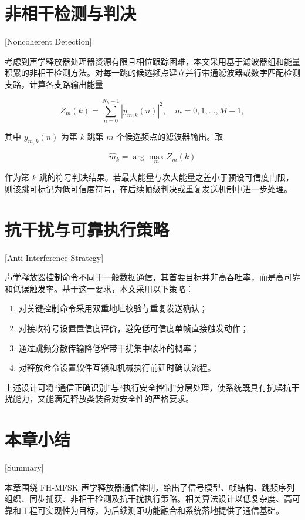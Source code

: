 \section{非相干检测与判决}[Noncoherent Detection]

考虑到声学释放器处理器资源有限且相位跟踪困难，本文采用基于滤波器组和能量积累的非相干检测方法。对每一跳的候选频点建立并行带通滤波器或数字匹配检测支路，计算各支路输出能量

\begin{equation}
  Z_m(k)=\sum_{n=0}^{N_h-1} \left|y_{m,k}(n)\right|^2,\quad m=0,1,\ldots,M-1,
  \label{eq:noncoherent_metric}
\end{equation}

其中 $y_{m,k}(n)$ 为第 $k$ 跳第 $m$ 个候选频点的滤波器输出。取

\begin{equation}
  \hat{m}_k = \arg\max_m Z_m(k)
\end{equation}

作为第 $k$ 跳的符号判决结果。若最大能量与次大能量之差小于预设可信度门限，则该跳可标记为低可信度符号，在后续帧级判决或重复发送机制中进一步处理。

\section{抗干扰与可靠执行策略}[Anti-Interference Strategy]

声学释放器控制命令不同于一般数据通信，其首要目标并非高吞吐率，而是高可靠和低误触发率。基于这一要求，本文采用以下策略：

\begin{enumerate}
  \item 对关键控制命令采用双重地址校验与重复发送确认；
  \item 对接收符号设置置信度评价，避免低可信度单帧直接触发动作；
  \item 通过跳频分散传输降低窄带干扰集中破坏的概率；
  \item 对释放命令设置软件互锁和机械执行前延时确认流程。
\end{enumerate}

上述设计可将“通信正确识别”与“执行安全控制”分层处理，使系统既具有抗噪抗干扰能力，又能满足释放类装备对安全性的严格要求。

\section*{本章小结}[Summary]

本章围绕 FH-MFSK 声学释放器通信体制，给出了信号模型、帧结构、跳频序列组织、同步捕获、非相干检测及抗干扰执行策略。相关算法设计以低复杂度、高可靠和工程可实现性为目标，为后续测距功能融合和系统落地提供了通信基础。

